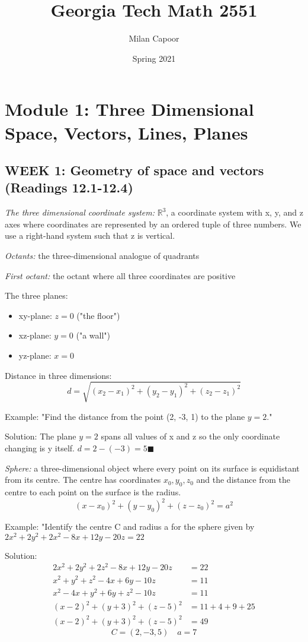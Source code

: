 \documentclass[12pt]{article}
\title{Georgia Tech Math 2551}
\author{Milan Capoor}
\date{Spring 2021}
\newcommand{\R}{\mathbb{R}}
\begin{document}
\maketitle
\section{Module 1: Three Dimensional Space, Vectors, Lines, Planes}
\subsection{WEEK 1: Geometry of space and vectors (Readings 12.1-12.4)}
\emph{The three dimensional coordinate system:} $\R^3$, a coordinate system with x, y, and z axes where coordinates are represented by an ordered tuple of three numbers. We use a right-hand system such that z is vertical. 

\emph{Octants:} the three-dimensional analogue of quadrants

\emph{First octant:} the octant where all three coordinates are positive

The three planes:
\begin{itemize}
    \item xy-plane: $z = 0$ ("the floor")
    \item xz-plane: $y = 0$ ("a wall")
    \item yz-plane: $x = 0$
\end{itemize}

Distance in three dimensions:
$$d = \sqrt{(x_2 - x_1)^2 + (y_2 - y_1)^2 + (z_2 - z_1)^2}$$

Example:
"Find the distance from the point (2, -3, 1) to the plane $y = 2$."

Solution:
The plane $y = 2$ spans all values of x and z so the only coordinate changing is y itself. $d = 2 - (-3) = 5 \blacksquare$

\emph{Sphere:} a three-dimensional object where every point on its surface is equidistant from its centre. The centre has coordinates $x_0, y_0, z_0$ and the distance from the centre to each point on the surface is the radius.
$$(x - x_0)^2 + (y-y_0)^2 + (z-z_0)^2 = a^2$$

Example:
"Identify the centre C and radius a for the sphere given by $2x^2 + 2y^2 + 2x^2 - 8x + 12y - 20z  = 22$

Solution:
\begin{align*}
    2x^2 + 2y^2 + 2z^2 - 8x + 12y - 20z  &= 22\\
    x^2 + y^2 + z^2 - 4x + 6y - 10z  &= 11\\
    x^2 - 4x + y^2 + 6y + z^2 - 10z &= 11\\
    (x - 2)^2 + (y + 3)^2 + (z - 5)^2 &= 11 + 4 + 9 + 25\\
    (x - 2)^2 + (y + 3)^2 + (z - 5)^2 &= 49
\end{align*}
$$C = (2, -3, 5) \quad a = 7$$
\end{document}
